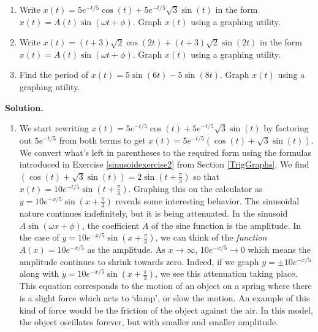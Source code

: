 \begin{ex} \label{underdampedresonance}  $~$  

\begin{enumerate}

\item  Write $x(t) = 5e^{-t/5} \cos(t) + 5e^{-t/5} \sqrt{3} \sin(t)$ in the form $x(t) = A(t) \sin(\omega t + \phi)$.  Graph $x(t)$ using a graphing utility.

\item  Write $x(t) = (t+3)\sqrt{2} \cos(2t) + (t+3) \sqrt{2} \sin(2t)$ in the form $x(t) = A(t) \sin(\omega t + \phi)$.  Graph $x(t)$  using a graphing utility.

\item  Find the period of $x(t) = 5\sin(6t) - 5\sin\left(8t\right)$.  Graph $x(t)$ using a graphing utility.

\end{enumerate}

{\bf Solution.}

\begin{enumerate}

\item  We start rewriting  $x(t) = 5e^{-t/5} \cos(t) + 5e^{-t/5} \sqrt{3} \sin(t)$ by factoring out   $5e^{-t/5}$ from both terms to get  $x(t) = 5e^{-t/5} \left( \cos(t) + \sqrt{3} \sin(t)\right)$. We convert what's left in parentheses to the required form using the formulas introduced in Exercise  \ref{sinusoidexercise2} from Section \ref{TrigGraphs}.  We find $\left( \cos(t) + \sqrt{3} \sin(t)\right) = 2\sin\left(t+\frac{\pi}{3}\right)$ so that $x(t) = 10e^{-t/5} \sin\left(t + \frac{\pi}{3}\right)$.  Graphing this on the calculator as $y = 10e^{-x/5} \sin\left(x + \frac{\pi}{3}\right)$ reveals some interesting behavior.  The sinusoidal nature continues indefinitely, but it is being attenuated.  In the sinusoid $A \sin(\omega x + \phi)$, the coefficient $A$ of the sine function is the amplitude.  In the case of $y = 10e^{-x/5} \sin\left(x + \frac{\pi}{3}\right)$, we can think of the \textit{function} $A(x) = 10e^{-x/5}$ as the amplitude.  As $x \rightarrow \infty$, $10e^{-x/5} \rightarrow 0$ which means the amplitude continues to shrink towards zero.  Indeed, if we graph $y = \pm 10e^{-x/5}$ along with $y = 10e^{-x/5} \sin\left(x + \frac{\pi}{3}\right)$, we see this attenuation taking place.  This equation corresponds to the motion of an object on a spring where there is a slight force which acts to `damp', or slow the motion.  An example of this kind of force would be the friction of the object against the air. In this model, the object oscillates forever, but with smaller and smaller amplitude. 
\begin{center}


\end{center}
\end{enumerate}
\end{ex}
